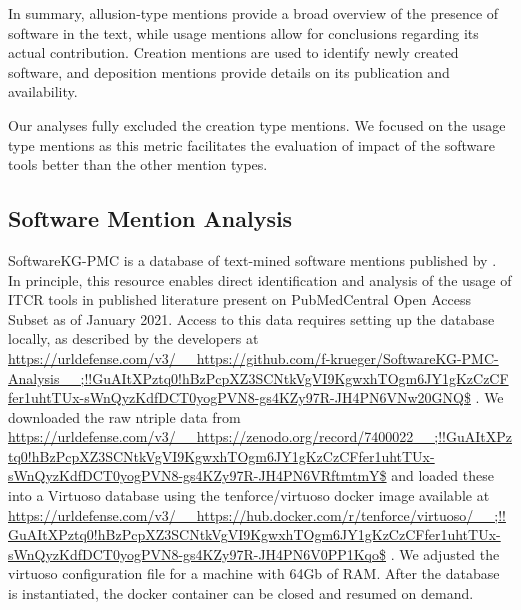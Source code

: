 \documentclass{article}
\begin{document}
In summary, allusion-type mentions provide a broad overview of the presence of software in the text, while usage mentions allow for conclusions regarding its actual contribution. Creation mentions are used to identify newly created software, and deposition mentions provide details on its publication and availability.

Our analyses fully excluded the creation type mentions. We focused on the usage type mentions as this metric facilitates the evaluation of impact of the software tools better than the other mention types. 


\subsection{Software Mention Analysis}


SoftwareKG-PMC is a database of text-mined software mentions published by \cite{Kruger_usage_20}. In principle, this resource enables direct identification and analysis of the usage of ITCR tools in published literature present on PubMedCentral Open Access Subset as of January 2021. Access to this data requires setting up the database locally, as described by the developers at \url{https://urldefense.com/v3/__https://github.com/f-krueger/SoftwareKG-PMC-Analysis__;!!GuAItXPztq0!hBzPcpXZ3SCNtkVgVI9KgwxhTOgm6JY1gKzCzCFfer1uhtTUx-sWnQyzKdfDCT0yogPVN8-gs4KZy97R-JH4PN6VNw20GNQ$} . We downloaded the raw ntriple data from \url{https://urldefense.com/v3/__https://zenodo.org/record/7400022__;!!GuAItXPztq0!hBzPcpXZ3SCNtkVgVI9KgwxhTOgm6JY1gKzCzCFfer1uhtTUx-sWnQyzKdfDCT0yogPVN8-gs4KZy97R-JH4PN6VRftmtmY$}  and loaded these into a Virtuoso database using the tenforce/virtuoso docker image available at \url{https://urldefense.com/v3/__https://hub.docker.com/r/tenforce/virtuoso/__;!!GuAItXPztq0!hBzPcpXZ3SCNtkVgVI9KgwxhTOgm6JY1gKzCzCFfer1uhtTUx-sWnQyzKdfDCT0yogPVN8-gs4KZy97R-JH4PN6V0PP1Kqo$} . We adjusted the virtuoso configuration file for a machine with 64Gb of RAM. After the database is instantiated, the docker container can be closed and resumed on demand.
\end{document}
